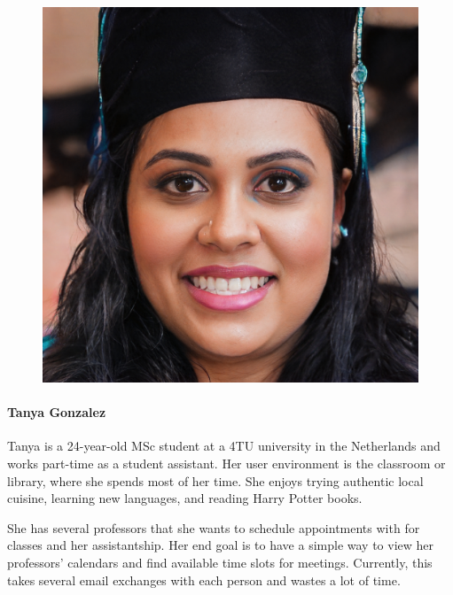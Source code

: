 \documentclass{article}
\begin{document}
\begin{figure}
	\includegraphics[scale=0.1]{persona-tanya.jpg}
\end{figure}

\paragraph{Tanya Gonzalez}

Tanya is a 24-year-old MSc student at a 4TU university in the Netherlands and works part-time as a student assistant. Her user environment is the classroom or library, where she spends most of her time. She enjoys trying authentic local cuisine, learning new languages, and reading Harry Potter books.

She has several professors that she wants to schedule appointments with for classes and her assistantship. Her end goal is to have a simple way to view her professors' calendars and find available time slots for meetings. Currently, this takes several email exchanges with each person and wastes a lot of time.
\end{document}
